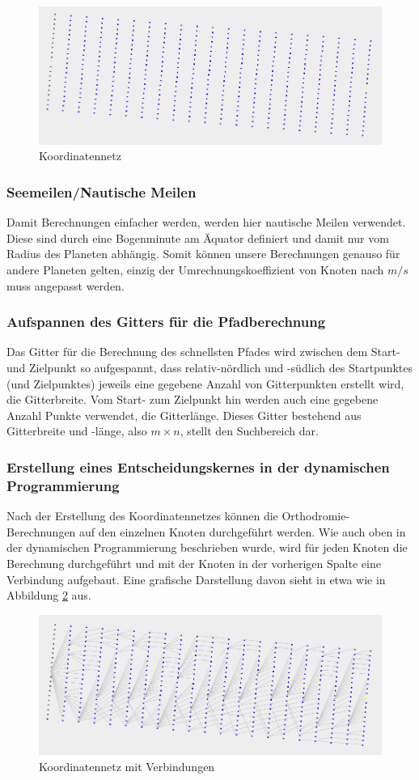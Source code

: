 \begin{figure}[h!]
\centering
\includegraphics[width=1\linewidth]{img/gridNet}
\caption{Koordinatennetz}
\label{gridnet}
\end{figure}

\subsubsection{Seemeilen/Nautische Meilen} Damit Berechnungen einfacher werden, werden
hier nautische Meilen\cite{nauticMile} verwendet. Diese sind durch eine Bogenminute am Äquator
definiert und damit nur vom Radius des Planeten abhängig. Somit können unsere
Berechnungen genauso für andere Planeten gelten, einzig der
Umrechnungskoeffizient von Knoten nach $m/s$ muss angepasst werden.

\subsubsection{Aufspannen des Gitters für die Pfadberechnung} Das Gitter für die
Berechnung des schnellsten Pfades wird zwischen dem Start- und Zielpunkt so
aufgespannt, dass relativ-nördlich und -südlich des Startpunktes (und
Zielpunktes) jeweils eine gegebene Anzahl von Gitterpunkten erstellt wird, die
Gitterbreite. Vom Start- zum Zielpunkt hin werden auch eine gegebene Anzahl
Punkte verwendet, die Gitterlänge. Dieses Gitter bestehend aus Gitterbreite und
-länge, also $m\times n$, stellt den Suchbereich dar.

\subsubsection{Erstellung eines Entscheidungskernes in der dynamischen Programmierung}
Nach der Erstellung des Koordinatennetzes können die Orthodromie-Berechnungen
auf den einzelnen Knoten durchgeführt werden. Wie auch oben in der dynamischen
Programmierung beschrieben wurde, wird für jeden Knoten die Berechnung
durchgeführt und mit der Knoten in der vorherigen Spalte eine Verbindung
aufgebaut. Eine grafische Darstellung davon sieht in etwa wie in Abbildung
\ref{gridnetConn} aus.

\begin{figure}[h!]
\centering
\includegraphics[width=1\linewidth]{img/gridNet_connections}
\caption{Koordinatennetz mit Verbindungen}
\label{gridnetConn}
\end{figure}


